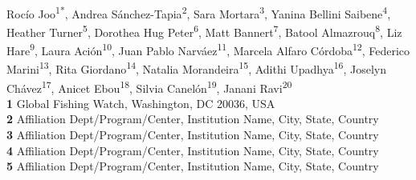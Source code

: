 \documentclass[10pt,letterpaper]{article}
\begin{document}
\newcommand{\fede}[1]{\textcolor{ForestGreen}{Fede: #1}}
\newcommand{\rocio}[1]{\textcolor{MidnightBlue}{Rocio: #1}}
\newcommand{\doro}[1]{\textcolor{RedViolet}{Dorothea: #1}}
\newcommand{\jani}[1]{\textcolor{YellowOrange}{Janina: #1}}
\newcommand{\la}[1]{\textcolor{RawSienna}{Laura: #1}}
\newcommand{\as}[1]{\textcolor{Violet}{Andrea: #1}}
\newcommand{\rita}[1]{\textcolor{CarnationPink}{Rita: #1}}

\vspace*{0.2in}

\begin{flushleft}
{\Large
\textbf{} %
}
\newline
\\
Rocío Joo\textsuperscript{1*}, %
Andrea Sánchez-Tapia\textsuperscript{2},
Sara Mortara\textsuperscript{3},
Yanina Bellini Saibene\textsuperscript{4},
Heather Turner\textsuperscript{5}, %
Dorothea Hug Peter\textsuperscript{6}, %
Matt Bannert\textsuperscript{7},
Batool Almazrouq\textsuperscript{8},
Liz Hare\textsuperscript{9},
Laura Ación\textsuperscript{10},
Juan Pablo Narváez\textsuperscript{11},
Marcela Alfaro Córdoba\textsuperscript{12},
Federico Marini\textsuperscript{13},
Rita Giordano\textsuperscript{14},
Natalia Morandeira\textsuperscript{15},
Adithi Upadhya\textsuperscript{16},
Joselyn Chávez\textsuperscript{17\Yinyang},
Anicet Ebou\textsuperscript{18\Yinyang},
Silvia Canelón\textsuperscript{19\Yinyang},
Janani Ravi\textsuperscript{20}
\\
\bigskip
\textbf{1} Global Fishing Watch, Washington, DC 20036, USA
\\
\textbf{2} Affiliation Dept/Program/Center, Institution Name, City, State, Country
\\
\textbf{3} Affiliation Dept/Program/Center, Institution Name, City, State, Country
\\
\textbf{4} Affiliation Dept/Program/Center, Institution Name, City, State, Country
\\
\textbf{5} Affiliation Dept/Program/Center, Institution Name, City, State, Country
\\

\end{flushleft}
\end{document}
